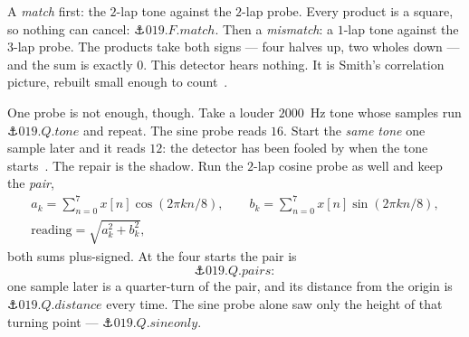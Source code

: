 \begin{narrative}
\begin{center}
\end{center}

A \emph{match} first: the $2$-lap tone against the $2$-lap probe. Every
product is a square, so nothing can cancel: $\anchor{019.F.match}$. Then
a \emph{mismatch}: a $1$-lap tone against the $3$-lap probe. The
products take both signs — four halves up, two wholes down — and the
sum is exactly $0$. This detector hears nothing. It is Smith's
correlation picture, rebuilt small enough to
count~\cite{signal_processing-smith-ch-8-analysis-calculating-the-dft}.

One probe is not enough, though. Take a louder $2000$~Hz tone whose
samples run $\anchor{019.Q.tone}$ and repeat. The sine probe reads
$16$. Start the \emph{same tone} one sample later and it reads $12$:
the detector has been fooled by when the tone
starts~\cite{signal_processing-schaedler-seeing-circles-sines-and-signals}.
The repair is the shadow. Run the $2$-lap cosine probe as well and keep
the \emph{pair},
\begin{gather*}
  a_k = \sum_{n=0}^{7} x[n] \cos(2\pi k n/8), \qquad
  b_k = \sum_{n=0}^{7} x[n] \sin(2\pi k n/8), \\
  \text{reading} = \sqrt{a_k^2 + b_k^2} ,
\end{gather*}
both sums plus-signed. At the four starts the pair is
\[
  \anchor{019.Q.pairs} :
\]
one sample later is a quarter-turn of the pair, and its distance from
the origin is $\anchor{019.Q.distance}$ every time. The sine probe alone saw only the height of that turning point —
$\anchor{019.Q.sineonly}$.


\end{narrative}

